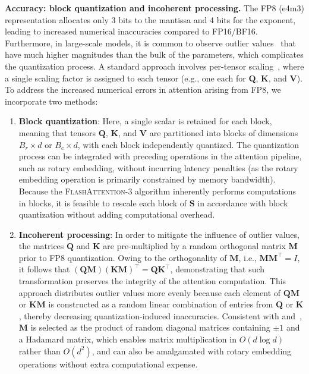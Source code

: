 \begin{algorithm}[H]
\begin{algorithmic}[1]
\textbf{Accuracy: block quantization and incoherent processing.} The FP8 (e4m3) representation allocates only 3 bits to the mantissa and 4 bits for the exponent, leading to increased numerical inaccuracies compared to FP16/BF16. Furthermore, in large-scale models, it is common to observe outlier values~\citep{dettmers2208llm,
  sun2024massive} that have much higher magnitudes than the bulk of the parameters, which complicates the quantization process. A standard approach involves per-tensor scaling~\citep{micikevicius2022fp8}, where a single scaling factor is assigned to each tensor (e.g., one each for $\mathbf{Q}$, $\mathbf{K}$, and $\mathbf{V}$).
To address the increased numerical errors in attention arising from FP8, we incorporate two methods:

\begin{enumerate}

\item \textbf{Block quantization}: Here, a single scalar is retained for each block, meaning that tensors $\mathbf{Q}$, $\mathbf{K}$, and $\mathbf{V}$ are partitioned into blocks of dimensions $B_r \times d$ or $B_c \times d$, with each block independently quantized. The quantization process can be integrated with preceding operations in the attention pipeline, such as rotary embedding, without incurring latency penalties (as the rotary embedding operation is primarily constrained by memory bandwidth). Because the \textsc{FlashAttention-3} algorithm inherently performs computations in blocks, it is feasible to rescale each block of $\mathbf{S}$ in accordance with block quantization without adding computational overhead.

\item \textbf{Incoherent processing}: In order to mitigate the influence of outlier values, the matrices $\mathbf{Q}$ and $\mathbf{K}$ are pre-multiplied by a random orthogonal matrix $\mathbf{M}$ prior to FP8 quantization. Owing to the orthogonality of $\mathbf{M}$, i.e., $\mathbf{M} \mathbf{M}^\top = I$, it follows that $(\mathbf{Q}\mathbf{M})(\mathbf{K}\mathbf{M})^\top = \mathbf{Q}\mathbf{K}^\top$, demonstrating that such transformation preserves the integrity of the attention computation. This approach distributes outlier values more evenly because each element of $\mathbf{Q}\mathbf{M}$ or $\mathbf{K}\mathbf{M}$ is constructed as a random linear combination of entries from $\mathbf{Q}$ or $\mathbf{K}$, thereby decreasing quantization-induced inaccuracies. Consistent with \citet{chee2024quip} and~\citet{tseng2024quip}, $\mathbf{M}$ is selected as the product of random diagonal matrices containing $\pm 1$ and a Hadamard matrix, which enables matrix multiplication in $O(d \log d)$ rather than $O(d^2)$, and can also be amalgamated with rotary embedding operations without extra computational expense.
\end{enumerate}


\end{algorithmic}
\end{algorithm}
